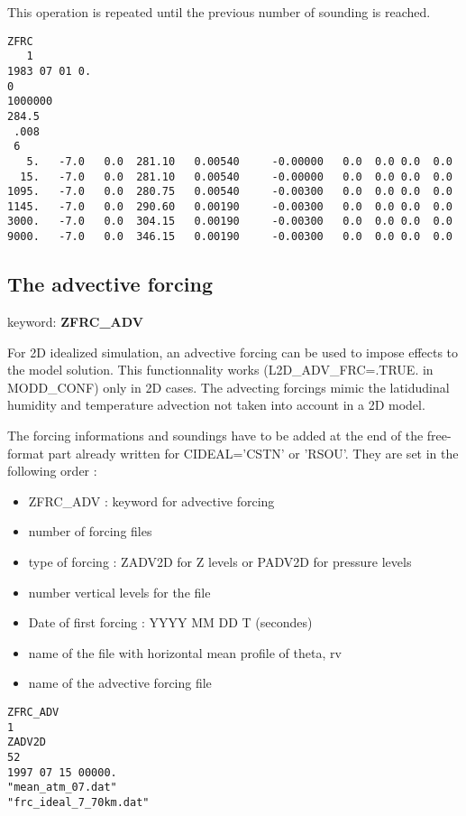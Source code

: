 This operation is repeated until the previous number of sounding is reached.

\begin{verbatim}
ZFRC
   1
1983 07 01 0.
0
1000000
284.5
 .008
 6
   5.   -7.0   0.0  281.10   0.00540     -0.00000   0.0  0.0 0.0  0.0
  15.   -7.0   0.0  281.10   0.00540     -0.00000   0.0  0.0 0.0  0.0
1095.   -7.0   0.0  280.75   0.00540     -0.00300   0.0  0.0 0.0  0.0
1145.   -7.0   0.0  290.60   0.00190     -0.00300   0.0  0.0 0.0  0.0
3000.   -7.0   0.0  304.15   0.00190     -0.00300   0.0  0.0 0.0  0.0
9000.   -7.0   0.0  346.15   0.00190     -0.00300   0.0  0.0 0.0  0.0
\end{verbatim}

\subsection{The advective forcing} \label{ss:adv_forcing}

keyword: {\bf ZFRC\_ADV} 

For 2D idealized simulation, an advective forcing can be used to impose effects to the model solution. This functionnality works (L2D\_ADV\_FRC=.TRUE. in MODD\_CONF) only in 2D cases. The advecting forcings mimic the latidudinal humidity and temperature advection not taken into account in a 2D model.
         
The forcing informations and soundings have to be added at the end of the
free-format part already written for CIDEAL='CSTN' or 'RSOU'. They are set in the following order : 
\begin{itemize}
\item ZFRC\_ADV : keyword for advective forcing
\item number of forcing files
\item type of forcing : ZADV2D for Z levels or PADV2D for  pressure levels
\item number vertical levels for the file
\item Date of first forcing : YYYY MM DD T (secondes)
\item name of the file with horizontal mean profile of theta, rv
\item name of the advective forcing file
\end{itemize}

                                   
\begin{verbatim}
ZFRC_ADV
1
ZADV2D
52
1997 07 15 00000.
"mean_atm_07.dat"
"frc_ideal_7_70km.dat"
\end{verbatim}

